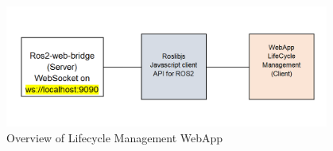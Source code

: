 













\begin{figure}[H]
	\centering
	\includegraphics[width=0.95\textwidth]{"Bilder/webapp-design.png"}
	\caption{Overview of Lifecycle Management WebApp}
	\label{fig:Background:WebappDesign}					
\end{figure}


